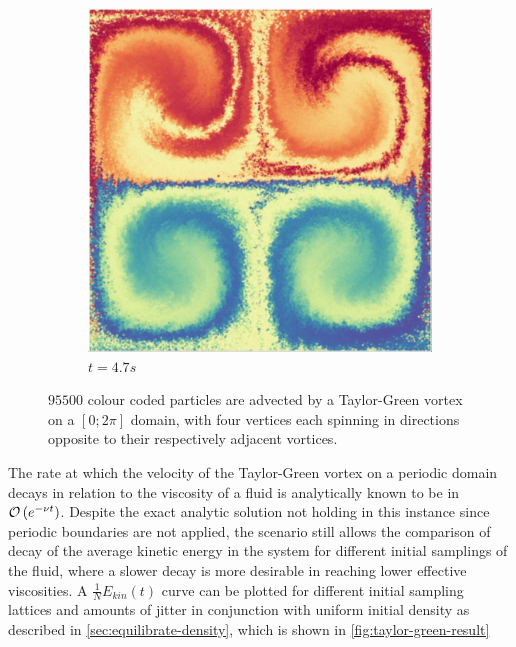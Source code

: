 \begin{figure}
\begin{subfigure}[t]{0.4\textwidth}
    \includegraphics[width=\textwidth]{images/density/taylorgreen_t4_70.jpg}
    \caption{$t=4.7s$}
  \end{subfigure}
  \caption{$95 500$ colour coded particles are advected by a Taylor-Green vortex on a $[0;2\pi]$ domain, with four vertices each spinning in directions opposite to their respectively adjacent vortices.}
  \label{fig:taylor-green-vortex}
\end{figure}

The rate at which the velocity of the Taylor-Green vortex on a periodic domain decays in relation to the viscosity of a fluid is analytically known to be\autocite*{taylor-green-arxiv} in $\mathcal{O}\left(e^{-\nu t}\right)$. Despite the exact analytic solution not holding in this instance since periodic boundaries are not applied, the scenario still allows the comparison of decay of the average kinetic energy in the system for different initial samplings of the fluid, where a slower decay is more desirable in reaching lower effective viscosities. A $\frac{1}{N}E_{kin}(t)$ curve can be plotted for different initial sampling lattices and amounts of jitter in conjunction with uniform initial density as described in \autoref{sec:equilibrate-density}, which is shown in \autoref{fig:taylor-green-result}



